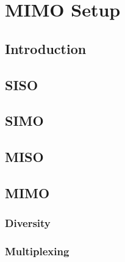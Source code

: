 \chapter{MIMO Setup}

\section*{Introduction}

\section{SISO}

\section{SIMO}

\section{MISO}

\section{MIMO}

\subsection{Diversity}

\subsection{Multiplexing}